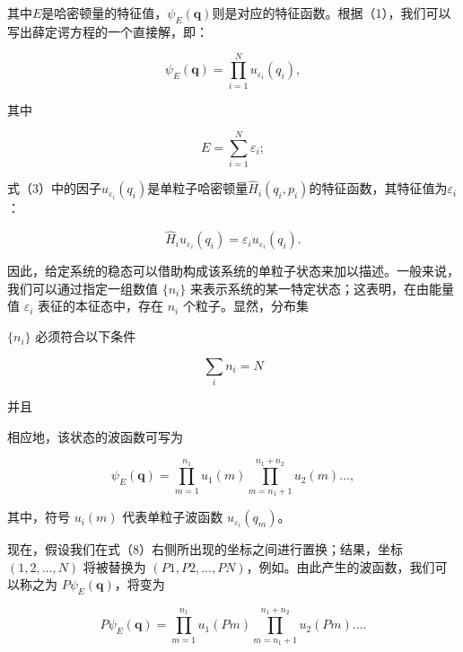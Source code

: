 其中\(E\)是哈密顿量的特征值，\(\psi_{E}(\boldsymbol{q})\)则是对应的特征函数。根据（1），我们可以写出薛定谔方程的一个直接解，即：

\begin{equation}\tag{5.4.3}\label{eq:5.4.3}
\psi _ { E } ( \pmb { q } ) = \prod _ { i = 1 } ^{N} u _ { \varepsilon _ { i } } ( q _ { i } ) ,
\end{equation}

其中

\begin{equation}\tag{5.4.4}\label{eq:5.4.4}
E = \sum _ { i = 1 } ^{N} \varepsilon _ { i } ;
\end{equation}

式（3）中的因子\(u_{\varepsilon_i}(q_i)\)是单粒子哈密顿量\(\hat{H}_i(q_i,p_i)\)的特征函数，其特征值为\(\varepsilon_i\)：

\begin{equation}\tag{5.4.5}\label{eq:5.4.5}
\hat { H } _ { i } u _ { \varepsilon _ { i } } ( q _ { i } ) = \varepsilon _ { i } u _ { \varepsilon _ { i } } ( q _ { i } ) .
\end{equation}

因此，给定系统的稳态可以借助构成该系统的单粒子状态来加以描述。一般来说，我们可以通过指定一组数值 \(\{n_i\}\) 来表示系统的某一特定状态；这表明，在由能量值 \(\varepsilon_i\) 表征的本征态中，存在 \(n_i\) 个粒子。显然，分布集

\(\{n_{i}\}\) 必须符合以下条件

\begin{equation}\tag{5.4.6}\label{eq:5.4.6}
\sum _ { i } n _ { i } = N
\end{equation}

并且

相应地，该状态的波函数可写为

\begin{equation}\tag{5.4.7}\label{eq:5.4.7}
\psi _ { E } ( \pmb { q } ) = \prod _ { m = 1 } ^{n _ { 1} } u _ { 1 } ( m )  \prod _ { m = n _ { 1 } + 1 } ^{n _ { 1} + n _ { 2 } } u _ { 2 } ( m ) \ldots ,
\end{equation}

其中，符号 \(u_{i}(m)\) 代表单粒子波函数 \(u_{\varepsilon_{i}}(q_{m})\)。

现在，假设我们在式（8）右侧所出现的坐标之间进行置换；结果，坐标 \((1,2,...,N)\) 将被替换为 \((P1,P2,...,PN)\)，例如。由此产生的波函数，我们可以称之为 \(P\psi_E(\boldsymbol{q})\)，将变为

\begin{equation}\tag{5.4.8}\label{eq:5.4.8}
P \psi _ { E } ( \pmb { q } ) = \prod _ { m = 1 } ^{n _ { 1} } u _ { 1 } ( P m ) \prod _ { m = n _ { 1 } + 1 } ^{n _ { 1} + n _ { 2 } } u _ { 2 } ( P m ) . . . .
\end{equation}

